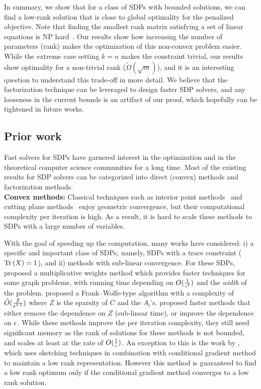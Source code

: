 In summary, we show that for a class of SDPs with bounded solutions, we can find a low-rank solution that is close to global optimality for the penalized objective. Note that finding the smallest rank matrix satisfying a set of linear equations is NP hard~\citep{natarajan1995sparse}. Our results show how increasing the number of parameters (rank) makes the optimization of this non-convex problem easier. While the extreme case setting $k = n$ makes the constraint trivial, our results show optimality for a non-trivial rank ($\tilde{\Omega}(\sqrt{m})$), and it is an interesting question to understand this trade-off in more detail. We believe that the factorization technique can be leveraged to design faster SDP solvers, and any looseness in the current bounds is an artifact of our proof, which hopefully can be tightened in future works. 

\subsection{Prior work}

Fast solvers for SDPs have garnered interest in the optimization and in the theoretical computer science communities for a long time. Most of the existing results for SDP solvers can be categorized into direct (convex) methods and factorization methods. \\

\noindent \textbf{Convex methods:}
Classical techniques such as interior point methods~\citep{ nesterov1989self, nesterov1988polynomial, alizadeh1995interior} and cutting plane methods~\citep{anstreicher2000volumetric,krishnan2003properties} enjoy geometric convergence, but their computational complexity per iteration is high. As a result, it is hard to scale these methods to SDPs with a large number of variables.

With the goal of speeding up the computation, many works have considered: i) a specific and important class of SDPs, namely, SDPs with a trace constraint ($\mathrm{Tr}\left(X\right)=1$), and ii) methods with sub-linear convergence. For these SDPs, \citet{arora2005fast} proposed a multiplicative weights method which provides faster techniques for some graph problems, with running time depending on $O(\frac{1}{\epsilon^2})$ and the \textit{width} of the problem.  \citet{hazan2008sparse} proposed a Frank--Wolfe-type algorithm with a complexity of $\tilde{O}( \frac{Z}{\epsilon^{3.5}})$ where $Z$ is the sparsity of $C$ and the $A_i$'s.  \citet{garber2016sublinear, garber2016faster}  proposed faster methods that either remove the dependence on $Z$ (sub-linear time), or improve the dependence on $\epsilon$. While these methods improve the per iteration complexity, they still need significant memory as the rank of solutions for these methods is not bounded, and scales at least at the rate of $O(\frac{1}{\epsilon})$.  An exception to this is the work by \citet{yurtsever2017sketchy}, which uses sketching techniques in combination with conditional gradient method to maintain a low rank representation. However this method is guaranteed to find a low rank optimum only if the conditional gradient method converges to a low rank solution. \\


